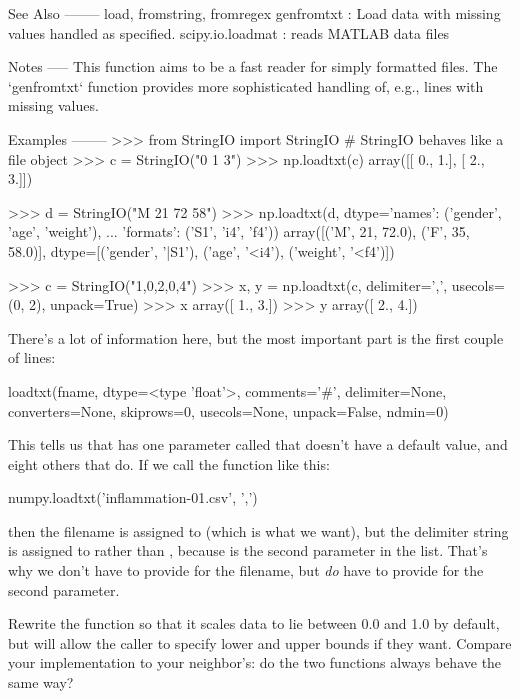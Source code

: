 \begin{VerbOut}
    See Also
    --------
    load, fromstring, fromregex
    genfromtxt : Load data with missing values handled as specified.
    scipy.io.loadmat : reads MATLAB data files

    Notes
    -----
    This function aims to be a fast reader for simply formatted files.  The
    `genfromtxt` function provides more sophisticated handling of, e.g.,
    lines with missing values.

    Examples
    --------
    >>> from StringIO import StringIO   # StringIO behaves like a file object
    >>> c = StringIO("0 1 3")
    >>> np.loadtxt(c)
    array([[ 0.,  1.],
           [ 2.,  3.]])

    >>> d = StringIO("M 21 72 58")
    >>> np.loadtxt(d, dtype={'names': ('gender', 'age', 'weight'),
    ...                      'formats': ('S1', 'i4', 'f4')})
    array([('M', 21, 72.0), ('F', 35, 58.0)],
          dtype=[('gender', '|S1'), ('age', '<i4'), ('weight', '<f4')])

    >>> c = StringIO("1,0,2,0,4")
    >>> x, y = np.loadtxt(c, delimiter=',', usecols=(0, 2), unpack=True)
    >>> x
    array([ 1.,  3.])
    >>> y
    array([ 2.,  4.])
\end{VerbOut}

There's a lot of information here, but the most important part is the
first couple of lines:

\begin{VerbOut}
loadtxt(fname, dtype=<type 'float'>, comments='#', delimiter=None, converters=None, skiprows=0, usecols=None,
        unpack=False, ndmin=0)
\end{VerbOut}

This tells us that  has one parameter called
 that doesn't have a default value, and eight others that
do. If we call the function like this:

\begin{VerbIn}
numpy.loadtxt('inflammation-01.csv', ',')
\end{VerbIn}

then the filename is assigned to  (which is what we want),
but the delimiter string  is assigned to 
rather than , because  is the second
parameter in the list. That's why we don't have to provide
 for the filename, but \emph{do} have to provide
 for the second parameter.

\begin{challenge}
  Rewrite the  function so that it scales data to lie
  between 0.0 and 1.0 by default, but will allow the caller to specify
  lower and upper bounds if they want. Compare your implementation to
  your neighbor's: do the two functions always behave the same way?
\end{challenge}

